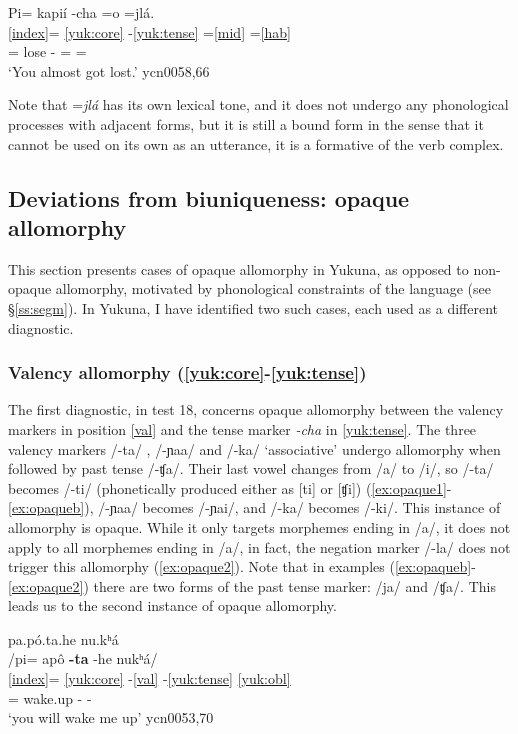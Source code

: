 \documentclass[output=paper]{langscibook}
\begin{document}
\ea \label{ex:freeocc3}
    \glll Pi= kapií -cha =o =jlá.  \\
         \ref{index}= \ref{yuk:core} -\ref{yuk:tense} =\ref{mid} =\ref{hab} \\
        \Tsg{}= lose -\Pst{} =\Mid{} =\Frust{}\\
    \glt `You almost got lost.' \hfill ycn0058,66
 \z

Note that =\textit{jlá} \Frust{} has its own lexical tone, and it does not undergo any phonological processes with adjacent forms, but it is still a bound form in the sense that it cannot be used on its own as an utterance, it is a formative of the verb complex. 

\subsection{Deviations from biuniqueness: opaque allomorphy}
\label{ss:opaque}

This section presents cases of opaque allomorphy in Yukuna, as opposed to non-opaque allomorphy, motivated by phonological constraints of the language (see §\ref{ss:segm}). In Yukuna, I have identified two such cases, each used as a different diagnostic.

\subsubsection{Valency allomorphy (\ref{yuk:core}-\ref{yuk:tense})}

The first diagnostic, in test 18, concerns opaque allomorphy between the valency markers in position \ref{val} and the tense marker \textit{-cha} in \ref{yuk:tense}. The three valency markers /-ta/ \Caus{}, /-ɲaa/ \Appl{} and /-ka/ `associative' undergo allomorphy when followed by past tense /-ʧa/. Their last vowel changes from /a/ to /i/, so /-ta/ becomes /-ti/ (phonetically produced either as [ti] or [ʧi]) (\ref{ex:opaque1}-\ref{ex:opaqueb}), /-ɲaa/ becomes /-ɲai/, and /-ka/ becomes /-ki/. This instance of allomorphy is opaque. While it only targets morphemes ending in /a/, it does not apply to all morphemes ending in /a/, in fact, the negation marker /-la/ \Neg{} does not trigger this allomorphy (\ref{ex:opaque2}). Note that in examples (\ref{ex:opaqueb}-\ref{ex:opaque2}) there are two forms of the past tense marker: /ja/ and /ʧa/. This leads us to the second instance of opaque allomorphy.


\ea \label{ex:opaque1}
pa.pó.ta.he nu.kʰá    \\
    \glll /pi= apô \textbf{-ta} -he nukʰá/ \\
         \ref{index}= \ref{yuk:core} -\ref{val} -\ref{yuk:tense} \ref{yuk:obl} \\
      \Tsg{}= wake.up -\Caus{} -\Fut{} \Fsg{} \\
    \glt `you will wake me up' \hfill ycn0053,70
 \z
 
\end{document}
